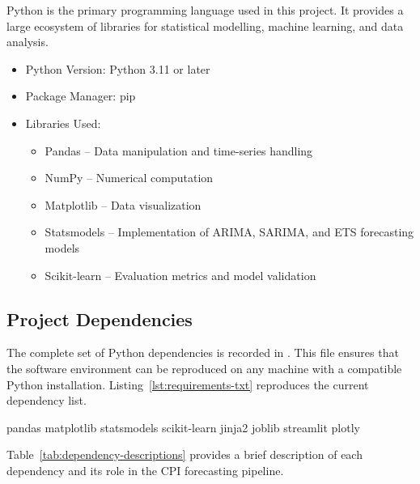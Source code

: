 Python is the primary programming language used in this project. It provides a large ecosystem of libraries for statistical modelling, machine learning, and data analysis.

\begin{itemize}
	\item Python Version: Python 3.11 or later
	\item Package Manager: pip
	\item Libraries Used:
	\begin{itemize}
		\item Pandas -- Data manipulation and time-series handling
		\item NumPy -- Numerical computation
		\item Matplotlib -- Data visualization
		\item Statsmodels -- Implementation of ARIMA, SARIMA, and ETS forecasting models
		\item Scikit-learn -- Evaluation metrics and model validation
	\end{itemize}
\end{itemize}

\subsection{Project Dependencies}

The complete set of Python dependencies is recorded in . This file ensures that the software environment can be reproduced on any machine with a compatible Python installation. Listing~\ref{lst:requirements-txt} reproduces the current dependency list.

\begin{Python}[caption={Project dependencies from \texttt{Code/requirements.txt}}, label={lst:requirements-txt}]
pandas
matplotlib
statsmodels
scikit-learn
jinja2
joblib
streamlit
plotly
\end{Python}

Table~\ref{tab:dependency-descriptions} provides a brief description of each dependency and its role in the CPI forecasting pipeline.

